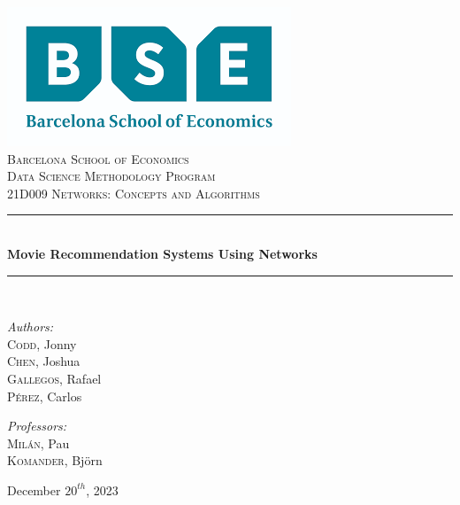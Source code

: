\documentclass[12pt]{article}
\date{\today}							%
\numberwithin{equation}{section}
\begin{document}
\begin{titlepage}
	\centering
    \includegraphics[scale = 0.7]{bse_logo.png}\\[1.2 cm]	%
    \textsc{\LARGE Barcelona School of Economics}\\[2.0 cm]	%
	\textsc{\Large Data Science Methodology Program}\\[0.5 cm]				%
	\textsc{\large 21D009 Networks: Concepts and Algorithms }\\[0.5 cm]				%
	\rule{\linewidth}{0.2 mm} \\[0.4 cm]
	{ \huge \bfseries Movie Recommendation Systems Using Networks}\\
	\rule{ \linewidth}{0.2 mm} \\[1.5 cm]
	
\begin{center}
    
{ \emph{Authors: }\\
    \textsc{Codd}, Jonny \\
    \textsc{Chen}, Joshua \\
    \textsc{Gallegos}, Rafael \\
    \textsc{Pérez}, Carlos \\ } 

\vspace{0.7cm}


    \textit{Professors:}\\  \textsc{Milán}, Pau \\
    	\textsc{Komander}, Björn
        \\ \vspace{0.5cm}


\vspace{1.7cm}


{\large December $20^{th}$, 2023} \\[2 cm]

 \end{center}
	\vfill
	
\end{titlepage}
	
\end{document}
